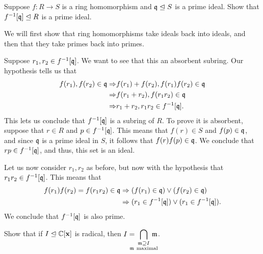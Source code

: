 \documentclass[12pt]{memoir}
\begin{document}
\begin{Ej}
  Suppose $f:R\to S$ is a ring homomorphism and $\mathfrak{q}\trianglelefteq S$ is a prime ideal. Show that $f^{-1}[\mathfrak{q}]\trianglelefteq R$ is a prime ideal.
\end{Ej}

\begin{ptcbr}
  We will first show that ring homomorphisms take ideals back into ideals, and then that they take primes back into primes.\par 
  Suppose $r_1,r_2\in f^{-1}[\mathfrak{q}]$. We want to see that this an absorbent subring. Our hypothesis tells us that 
  \begin{align*}
    f(r_1),f(r_2)\in\mathfrak{q}\Rightarrow&f(r_1)+f(r_2),f(r_1)f(r_2)\in\mathfrak{q}\\
    \Rightarrow&f(r_1+r_2),f(r_1r_2)\in\mathfrak{q}\\
    \Rightarrow&r_1+r_2,r_1r_2\in f^{-1}[\mathfrak{q}].
  \end{align*}
  This lets us conclude that $f^{-1}[\mathfrak{q}]$ is a subring of $R$. To prove it is absorbent, suppose that $r\in R$ and $p\in f^{-1}[\mathfrak{q}]$. This means that $f(r)\in S$ and $f(p)\in\mathfrak{q}$, and since $\mathfrak{q}$ is a prime ideal in $S$, it follows that $f(r)f(p)\in\mathfrak{q}$. We conclude that $rp\in f^{-1}[\mathfrak{q}]$, and thus, this set is an ideal.\par 
  Let us now consider $r_1,r_2$ as before, but now with the hypothesis that $r_1r_2\in f^{-1}[\mathfrak{q}]$. This means that 
  \begin{align*}
    f(r_1)f(r_2)=f(r_1r_2)\in\mathfrak{q}&\Rightarrow (f(r_1)\in\mathfrak{q})\lor(f(r_2)\in\mathfrak{q})\\
    &\Rightarrow(r_1\in f^{-1}[\mathfrak{q}])\lor(r_1\in f^{-1}[\mathfrak{q}]).
  \end{align*}
  We conclude that $f^{-1}[\mathfrak{q}]$ is also prime. 
\end{ptcbr}
\newpage
\begin{Ej}[2.3.3]
  Show that if $I\trianglelefteq\mathbb{C}[\mathbf{x}]$ is radical, then $I=\hspace{-1em}\displaystyle\bigcap_{\substack{\mathfrak{m}\supseteq I\\
  \mathfrak{m}\ \text{maximal}}}\hspace{-1em}\mathfrak{m}$.
\end{Ej}
\end{document}
